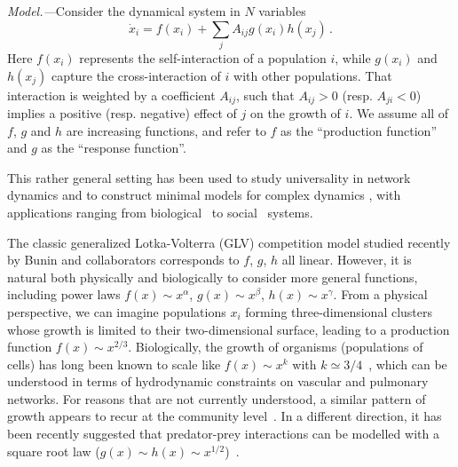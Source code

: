 \emph{Model.---}Consider the dynamical system in $N$ variables
\begin{equation}\label{dynamics}
    \dot{x}_i = f(x_i) + \sum_{j}A_{ij}g(x_i)h(x_j) \, .
\end{equation}
Here $f(x_i)$ represents the self-interaction of a population $i$, while $g(x_i)$ and $h(x_j)$ capture the cross-interaction of $i$ with other populations. That interaction is weighted by a coefficient $A_{ij}$, such that $A_{ij} > 0$ (resp.
$A_{ji} < 0$) implies a positive (resp.
negative) effect of $j$ on the growth of $i$. 
We assume all of $f$, $g$ and $h$ are increasing functions, and refer to $f$ as the ``production function'' and $g$ as the ``response function''.

This rather general setting has been used to study universality in network dynamics \cite{Barzel2013} and to construct minimal models for complex dynamics \cite{Barzel2015}, with applications ranging from biological~\cite{Alon2006,Karlebach2008} 
to social~\cite{Pastor-Satorras2001,Hufnagel2004,Dodds2005} systems.

The classic generalized Lotka-Volterra (GLV) competition model studied recently by Bunin and collaborators \cite{bunin2017ecological, biroli2018marginally} corresponds to $f$, $g$, $h$ all linear. 
However, it is natural both physically and biologically to consider more general functions, including power laws $f(x)\sim x^\alpha$, $g(x)\sim x^\beta$, $h(x) \sim x^\gamma$.
From a physical perspective, we can imagine populations $x_i$ forming three-dimensional clusters whose growth is limited to their two-dimensional surface, leading to a production function $f(x) \sim x^{2/3}$.
Biologically, the growth of organisms (populations of cells) has long been known to scale like $f(x) \sim x^k$ with $k\simeq 3/4$~\cite{Brown2004}, which can be understood in terms of hydrodynamic constraints on vascular and pulmonary networks.
For reasons that are not currently understood, a similar pattern of growth appears to recur at the community level~\cite{Hatton2015,Hatton2023}.
In a different direction, it has been recently suggested that predator-prey interactions can be modelled with a square root law ($g(x) \sim h(x) \sim x^{1/2}$)~\cite{Barbier2021,Mazzarisi2023}.

